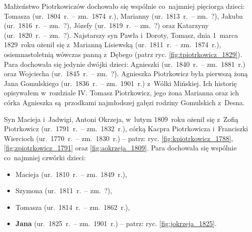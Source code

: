 Małżeństwo Piotrkowiczów dochowało się wspólnie co~najmniej pięciorga dzieci:
Tomasza (ur.~1804~r.~--
zm.~1874~r.), Marianny
(ur.~1813~r.~-- zm.~?), Jakuba
(ur.~1816~r.~-- zm.~?), Józefy
(ur.~1819~r.~-- zm.~?) oraz Katarzyny
(ur.~1820~r.~-- zm.~?). Najstarszy syn Pawła i~Doroty, Tomasz, dnia 1~marca
1829~roku ożenił się z~Marianną
Lisiewską
(ur.~1811~r.~-- zm.~1874~r.), osiemnastoletnią wówczas panną z~Dębego (patrz
ryc. \ref{fig:tpiotrkowicz_1829}). Para dochowała się jedynie dwójki dzieci:
Agnieszki
(ur.~1840~r.~-- zm.~1881~r.) oraz
Wojciecha
(ur.~1845~r.~-- zm.~?). Agnieszka Piotrkowicz była pierwszą żoną
Jana Gomulskiego (ur.~1836~r.~--
zm.~1901~r.) z~Wólki Mińskiej. Ich historię opisywałem w~rozdziale IV.
Tomasz Piotrkowicz,
jego żona Marianna
oraz ich córka Agnieszka
są~przodkami najmłodszej gałęzi rodziny Gomulskich z~Desna.

\newpage
{}
\label{sec:kf_piotrkowicze}

Syn Macieja i~Jadwigi, Antoni
Okrzeja, w~lutym
1809~roku ożenił się z~Zofią
Piotrkowicz
(ur.~1791~r.~-- zm.~1832~r.), córką Kacpra
Piotrkowicza
i~Franciszki Wiercioch
(ur.~1770~r.~-- zm.~1830~r.) -- patrz: ryc. \ref{fig:kpiotrkowicz_1788},
\ref{fig:zpiotrkowicz_1791} oraz \ref{fig:aokrzeja_1809}. Para
dochowała się wspólnie co~najmniej czwórki dzieci:

\begin{itemize}
\item Macieja (ur.~1810~r.~--
zm.~1849~r.),
\item Szymona
(ur.~1811~r.~-- zm.~?),
\item Tomasza 
(ur.~1814~r.~-- zm.~1862~r.),
\item \textbf{Jana}
(ur.~1825~r.~-- zm.~1901~r.) -- patrz: ryc. \ref{fig:jokrzeja_1825}.
\end{itemize}

